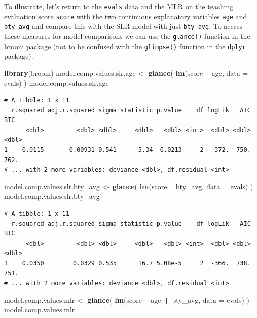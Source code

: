 \documentclass[]{article}
\newenvironment{Shaded}{\begin{snugshade}}{\end{snugshade}}
\newcommand{\KeywordTok}[1]{\textcolor[rgb]{0.13,0.29,0.53}{\textbf{#1}}}
\newcommand{\DataTypeTok}[1]{\textcolor[rgb]{0.13,0.29,0.53}{#1}}
\newcommand{\StringTok}[1]{\textcolor[rgb]{0.31,0.60,0.02}{#1}}
\newcommand{\OperatorTok}[1]{\textcolor[rgb]{0.81,0.36,0.00}{\textbf{#1}}}
\newcommand{\NormalTok}[1]{#1}
\begin{document}
To illustrate, let's return to the \texttt{evals} data and the MLR on
the teaching evaluation score \texttt{score} with the two continuous
explanatory variables \texttt{age} and \texttt{bty\_avg} and compare
this with the SLR model with just \texttt{bty\_avg}. To access these
measures for model comparisons we can use the \texttt{glance()} function
in the broom package (not to be confused with the \texttt{glimpse()}
function in the \texttt{dplyr} package).

\begin{Shaded}
\begin{Highlighting}[]
\KeywordTok{library}\NormalTok{(broom)}
\NormalTok{model.comp.values.slr.age <-}\StringTok{ }\KeywordTok{glance}\NormalTok{( }\KeywordTok{lm}\NormalTok{(score }\OperatorTok{~}\StringTok{ }\NormalTok{age, }\DataTypeTok{data =}\NormalTok{ evals) )}
\NormalTok{model.comp.values.slr.age}
\end{Highlighting}
\end{Shaded}

\begin{verbatim}
# A tibble: 1 x 11
  r.squared adj.r.squared sigma statistic p.value    df logLik   AIC   BIC
      <dbl>         <dbl> <dbl>     <dbl>   <dbl> <int>  <dbl> <dbl> <dbl>
1    0.0115       0.00931 0.541      5.34  0.0213     2  -372.  750.  762.
# ... with 2 more variables: deviance <dbl>, df.residual <int>
\end{verbatim}

\begin{Shaded}
\begin{Highlighting}[]
\NormalTok{model.comp.values.slr.bty_avg <-}\StringTok{ }\KeywordTok{glance}\NormalTok{( }\KeywordTok{lm}\NormalTok{(score }\OperatorTok{~}\StringTok{ }\NormalTok{bty_avg, }\DataTypeTok{data =}\NormalTok{ evals) )}
\NormalTok{model.comp.values.slr.bty_avg}
\end{Highlighting}
\end{Shaded}

\begin{verbatim}
# A tibble: 1 x 11
  r.squared adj.r.squared sigma statistic p.value    df logLik   AIC   BIC
      <dbl>         <dbl> <dbl>     <dbl>   <dbl> <int>  <dbl> <dbl> <dbl>
1    0.0350        0.0329 0.535      16.7 5.08e-5     2  -366.  738.  751.
# ... with 2 more variables: deviance <dbl>, df.residual <int>
\end{verbatim}

\begin{Shaded}
\begin{Highlighting}[]
\NormalTok{model.comp.values.mlr <-}\StringTok{ }\KeywordTok{glance}\NormalTok{( }\KeywordTok{lm}\NormalTok{(score }\OperatorTok{~}\StringTok{ }\NormalTok{age }\OperatorTok{+}\StringTok{ }\NormalTok{bty_avg, }\DataTypeTok{data =}\NormalTok{ evals) )}
\NormalTok{model.comp.values.mlr}
\end{Highlighting}
\end{Shaded}
\end{document}

